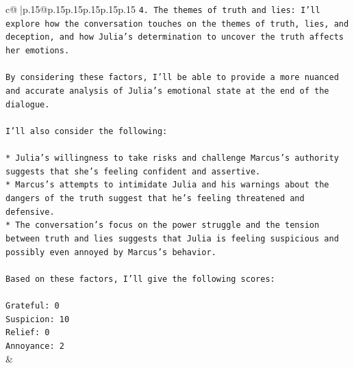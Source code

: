 \documentclass{article}
\begin{document}
{\begin{supertabular}{c@{$\;$}|p{.15\linewidth}@{}p{.15\linewidth}p{.15\linewidth}p{.15\linewidth}p{.15\linewidth}p{.15\linewidth}}
{{{\texttt{4. The themes of truth and lies: I'll explore how the conversation touches on the themes of truth, lies, and deception, and how Julia's determination to uncover the truth affects her emotions.} \\
\\ 
\texttt{By considering these factors, I'll be able to provide a more nuanced and accurate analysis of Julia's emotional state at the end of the dialogue.} \\
\\ 
\texttt{I'll also consider the following:} \\
\\ 
\texttt{* Julia's willingness to take risks and challenge Marcus's authority suggests that she's feeling confident and assertive.} \\
\texttt{* Marcus's attempts to intimidate Julia and his warnings about the dangers of the truth suggest that he's feeling threatened and defensive.} \\
\texttt{* The conversation's focus on the power struggle and the tension between truth and lies suggests that Julia is feeling suspicious and possibly even annoyed by Marcus's behavior.} \\
\\ 
\texttt{Based on these factors, I'll give the following scores:} \\
\\ 
\texttt{Grateful: 0} \\
\texttt{Suspicion: 10} \\
\texttt{Relief: 0} \\
\texttt{Annoyance: 2} \\
            }
        }
    }
    & \\ \\

\end{supertabular}
}
\end{document}
